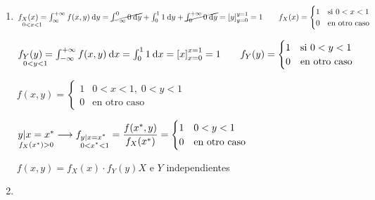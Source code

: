 

\begin{enumerate}[label=\color{red}\arabic*), leftmargin=*]
	\item {}
	
	$\underset{0<x<1}{f_X(x)=}\int_{\infty}^{+\infty}f(x,y)\:\mathrm{d}y=\cancel{\int_{-\infty}^{0}0\:\mathrm{d}y}+\int_{0}^{1}1\:\mathrm{d}y+\cancel{\int_{0}^{+\infty}0\:\mathrm{d}y}=\left[y\right]_{y=0}^{y=1}=1\qquad f_X(x)=\begin{cases}
	1 & \text{si }0<x<1\\
	0 & \text{en otro caso}
	\end{cases}$
	
	$\underset{0<y<1}{f_Y(y)=}\int_{-\infty}^{+\infty}f(x,y)\:\mathrm{d}x=\int_{0}^{1}1\:\mathrm{d}x=\left[x\right]_{x=0}^{x=1}=1\qquad f_Y(y)=\begin{cases}
	1 & \text{si }0<y<1\\
	0 & \text{en otro caso}
	\end{cases}$
	
	$f(x,y)=\begin{cases}
	1 & 0<x<1,\;0<y<1\\
	0 & \text{en otro caso}
	\end{cases}$
	
	$\underset{f_X(x^*)>0}{y|x=x^*}\longrightarrow f_{\begin{subarray}{l}
	y|x=x^*\\
	0<x^*<1
	\end{subarray}}=\dfrac{f(x^*,y)}{f_X(x^*)}=\begin{cases}
	1 & 0<y<1\\
	0 & \text{en otro caso}
	\end{cases}$
	
	$f(x,y)=f_X(x)\cdot f_Y(y)$\quad $X$ e $Y$ independientes
	
	\item {}
	

\end{enumerate}
